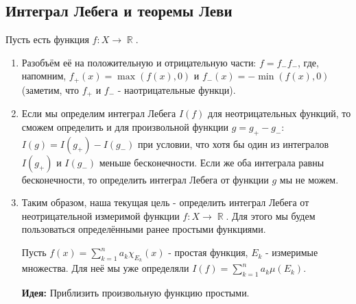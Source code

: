 \documentclass[a4paper]{article}
\theoremstyle{indented}
\theoremstyle{definition}
\theoremstyle{remark}
\DeclareMathOperator{\ra}{\rightarrow}
\DeclareMathOperator{\RR}{\mathbb{R}}
\begin{document}
\subsection{Интеграл Лебега и теоремы Леви}
Пусть есть функция $f: X \ra \RR$.
\begin{enumerate}
    \item Разобъём её на положительную и отрицательную части: $f=f_-f_-$, где, напомним,  $f_+(x)=\max(f(x), 0)$ и $f_-(x)=-\min(f(x), 0)$ (заметим, что $f_+$ и $f_-$ - наотрицательные функци).
    \item Если мы определим интеграл Лебега $I(f)$ для неотрицательных функций, то сможем определить и для произвольной функции $g=g_+-g_-$: $I(g)=I(g_+)-I(g_-)$ при условии, что хотя бы один из интегралов $I(g_+)$ и $I(g_-)$ меньше бесконечности. Если же оба интеграла равны бесконечности, то определить интеграл Лебега от функции $g$ мы не можем.
    \item Таким образом, наша текущая цель - определить интеграл Лебега от неотрицательной измеримой функции $f: X \ra \RR$. Для этого мы будем пользоваться определёнными ранее простыми функциями.
    
    Пусть $f(x) = \sum_{k=1}^na_k \chi_{E_k}(x)$ - простая функция, $E_k$ - измеримые множества. Для неё мы уже определяли $I(f)=\sum_{k=1}^na_k\mu(E_k)$.
    
    \textbf{Идея:} Приблизить произвольную функцию простыми.
\end{enumerate}
 
\end{document}
